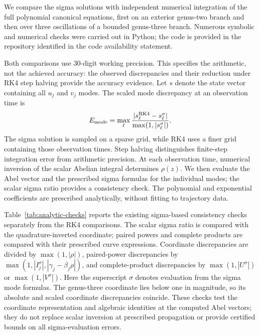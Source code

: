 \documentclass[11pt]{article}
\begin{document}
We compare the sigma solutions with independent numerical integration of the full polynomial canonical equations, first on an exterior genus-two branch and then over three oscillations of a bounded genus-three branch. Numerous symbolic and numerical checks were carried out in Python; the code is provided in the repository identified in the code availability statement.

Both comparisons use 30-digit working precision. This specifies the arithmetic, not the achieved accuracy: the observed discrepancies and their reduction under RK4 step halving provide the accuracy evidence. Let $s$ denote the state vector containing all $u_j$ and $v_j$ modes. The scaled mode discrepancy at an observation time is
\[
E_{\rm mode}=\max_\ell\frac{|s_\ell^{\rm RK4}-s_\ell^\sigma|}{\max(1,|s_\ell^\sigma|)}.
\]
The sigma solution is sampled on a sparse grid, while RK4 uses a finer grid containing those observation times. Step halving distinguishes finite-step integration error from arithmetic precision. At each observation time, numerical inversion of the scalar Abelian integral determines $\rho(z)$. We then evaluate the Abel vector and the prescribed sigma formulas for the individual modes; the scalar sigma ratio provides a consistency check. The polynomial and exponential coefficients are prescribed analytically, without fitting to trajectory data.

Table~\ref{tab:analytic-checks} reports the existing sigma-based consistency checks separately from the RK4 comparisons. The scalar sigma ratio is compared with the quadrature-inverted coordinate; paired powers and complete products are compared with their prescribed curve expressions. Coordinate discrepancies are divided by $\max(1,|\rho|)$, paired-power discrepancies by $\max(1,|I_j^\sigma|,|\gamma_j-\beta_j\rho|)$, and complete-product discrepancies by $\max(1,|U^\sigma|)$ or $\max(1,|V^\sigma|)$. Here the superscript $\sigma$ denotes evaluation from the sigma mode formulas. The genus-three coordinate lies below one in magnitude, so its absolute and scaled coordinate discrepancies coincide. These checks test the coordinate representation and algebraic identities at the computed Abel vectors; they do not replace scalar inversion at prescribed propagation or provide certified bounds on all sigma-evaluation errors.
\end{document}
